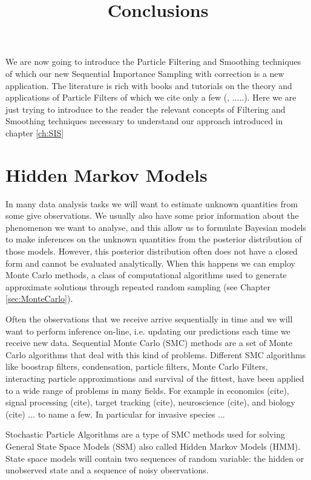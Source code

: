 \documentclass[11pt,a4paper]{article}
\title{Conclusions}
\begin{document}
We are now going to introduce the Particle Filtering and Smoothing techniques of which our new Sequential Importance Sampling with correction is a new application.
The literature is rich with books and tutorials on the theory and applications of Particle Filters of which we cite only a few (\cite{DoucetBook}, \cite{DoucetTutorial} \cite{Speekenbrink} .....). Here we are just trying to introduce to the reader the relevant concepts of Filtering and Smoothing techniques necessary to understand our approach introduced in chapter \ref{ch:SIS}


\section{Hidden Markov Models} \label{sec:HMM}

In many data analysis tasks we will want to estimate unknown quantities from some give observations. We usually also have some prior information about the phenomenon we want to analyse, and this allow us to formulate Bayesian models to make inferences on the unknown quantities from the posterior distribution of those models. However, this posterior distribution often does not have a closed form and cannot be evaluated analytically. When this happens we can employ Monte Carlo methods, a class of computational algorithms used to generate approximate solutions through repeated random sampling (see Chapter \ref{sec:MonteCarlo}).

Often the observations that we receive arrive sequentially in time and we will want to perform inference on-line, i.e. updating our predictions each time we receive new data. Sequential Monte Carlo (SMC) methods are a set of Monte Carlo algorithms that deal with this kind of problems. 
Different SMC algorithms like boostrap filters, condensation, particle filters, Monte Carlo Filters, interacting particle approximations and survival of the fittest, have been applied to a wide range of problems in many fields. For example in economics (cite), signal processing (cite), target tracking (cite), neuroscience (cite), and biology (cite) ... to name a few. In particular for invasive species ...

Stochastic Particle Algorithms are a type of SMC methods used for solving General State Space Models (SSM) also called Hidden Markov Models (HMM). State space models will contain two sequences of random variable: the hidden or unobserved state and a sequence of noisy observations. 
\end{document}
